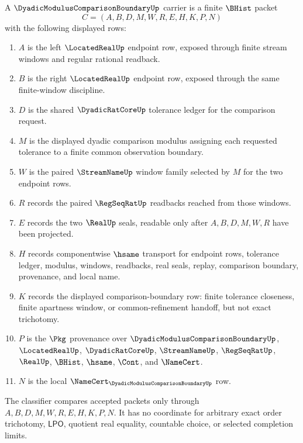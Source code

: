 \begin{definition}
\label{def:dyadic-modulus-comparison-boundary-carrier}
A $\DyadicModulusComparisonBoundaryUp$ carrier is a finite $\BHist$ packet
$$
C=(A,B,D,M,W,R,E,H,K,P,N)
$$
with the following displayed rows:
\begin{enumerate}
\item $A$ is the left $\LocatedRealUp$ endpoint row, exposed through finite stream windows and regular rational readback.
\item $B$ is the right $\LocatedRealUp$ endpoint row, exposed through the same finite-window discipline.
\item $D$ is the shared $\DyadicRatCoreUp$ tolerance ledger for the comparison request.
\item $M$ is the displayed dyadic comparison modulus assigning each requested tolerance to a finite common observation boundary.
\item $W$ is the paired $\StreamNameUp$ window family selected by $M$ for the two endpoint rows.
\item $R$ records the paired $\RegSeqRatUp$ readbacks reached from those windows.
\item $E$ records the two $\RealUp$ seals, readable only after $A,B,D,M,W,R$ have been projected.
\item $H$ records componentwise $\hsame$ transport for endpoint rows, tolerance ledger, modulus, windows, readbacks, real seals, replay, comparison boundary, provenance, and local name.
\item $K$ records the displayed comparison-boundary row: finite tolerance closeness, finite apartness window, or common-refinement handoff, but not exact trichotomy.
\item $P$ is the $\Pkg$ provenance over $\DyadicModulusComparisonBoundaryUp$, $\LocatedRealUp$, $\DyadicRatCoreUp$, $\StreamNameUp$, $\RegSeqRatUp$, $\RealUp$, $\BHist$, $\hsame$, $\Cont$, and $\NameCert$.
\item $N$ is the local $\NameCert_{\DyadicModulusComparisonBoundaryUp}$ row.
\end{enumerate}
The classifier compares accepted packets only through $A,B,D,M,W,R,E,H,K,P,N$. It has no coordinate for arbitrary exact order trichotomy, $\mathsf{LPO}$, quotient real equality, countable choice, or selected completion limits.
\end{definition}

